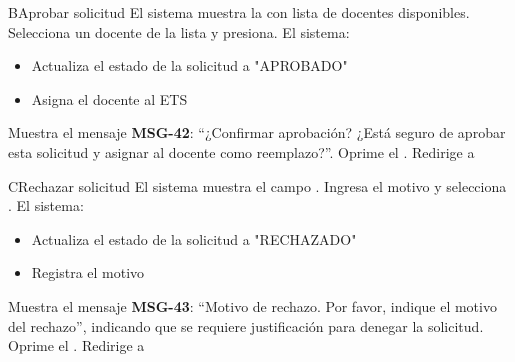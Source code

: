 \begin{UCtrayectoriaA}{B}{Aprobar solicitud}
	\UCpaso El sistema muestra la  con lista de docentes disponibles.
	\UCpaso[\UCactor] Selecciona un docente de la lista y presiona.
	\UCpaso El sistema:
	\begin{itemize}
		\item Actualiza el estado de la solicitud a "APROBADO"
		\item Asigna el docente al ETS
	\end{itemize}
	\UCpaso Muestra el mensaje \textbf{MSG-42}: ``¿Confirmar aprobación? ¿Está seguro de aprobar esta solicitud y asignar al docente como reemplazo?''.
	\UCpaso[\UCactor] Oprime el .
	\UCpaso Redirige a 
\end{UCtrayectoriaA}
\begin{UCtrayectoriaA}{C}{Rechazar solicitud}
	\UCpaso El sistema muestra el campo .
	\UCpaso[\UCactor] Ingresa el motivo y selecciona .
	\UCpaso El sistema:
	\begin{itemize}
		\item Actualiza el estado de la solicitud a "RECHAZADO"
		\item Registra el motivo
	\end{itemize}
	\UCpaso Muestra el mensaje \textbf{MSG-43}: ``Motivo de rechazo. Por favor, indique el motivo del rechazo'', indicando que se requiere justificación para denegar la solicitud.
	\UCpaso[\UCactor] Oprime el .
	\UCpaso Redirige a 
\end{UCtrayectoriaA}

